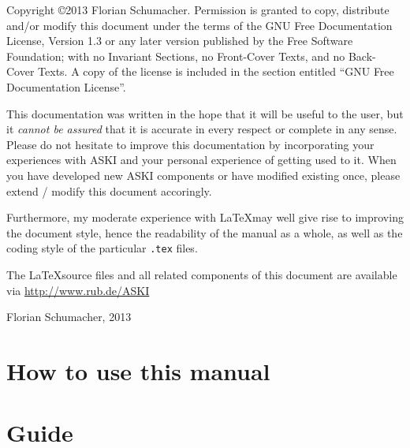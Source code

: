 \documentclass[12pt,a4paper]{book}
\newcommand{\lcode}[1]{\nolinkurl{#1}}
\newcommand{\ASKI}{ {\ttfamily ASKI} }
\begin{document}
%
\setlength{\parindent}{0cm}
\addtolength{\parskip}{0.1cm}
%
%

%
Copyright \copyright 2013 Florian Schumacher.
Permission is granted to copy, distribute and/or modify this document
under the terms of the GNU Free Documentation License, Version 1.3
or any later version published by the Free Software Foundation;
with no Invariant Sections, no Front-Cover Texts, and no Back-Cover Texts.
A copy of the license is included in the section entitled ``GNU
Free Documentation License''.

\vspace{1cm}

This documentation was written in the hope that it will be useful to the user,
but it \emph{cannot be assured} that it is accurate in every respect or complete in any sense.\\
Please do not hesitate to improve this documentation by incorporating your experiences with \ASKI 
and your personal experience of getting used to it. When you have developed new \ASKI components or 
have modified existing once, please extend / modify this document accoringly.

Furthermore, my moderate experience with \LaTeX may well give rise to improving the document 
style, hence the readability of the manual as a whole, as well as the coding style of the 
particular \lcode{.tex} files. 

The \LaTeX source files and all related components of this document are available via 
\url{http://www.rub.de/ASKI}
\begin{flushright}
Florian Schumacher, 2013
\end{flushright}
%
\chapter*{How to use this manual}

%
\tableofcontents
%
\setcounter{chapter}{-1}
\chapter{Guide} \label{guide}

%
\end{document}
